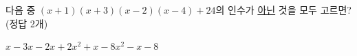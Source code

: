 다음 중 $(x+1)(x+3)(x-2)(x-4)+24$의 인수가 \underline{아닌} 것을 모두 고르면? (정답 2개)
\begin{choices32}{$x-3$}{$x-2$}{$x+2$}{$x^2+x-8$}{$x^2-x-8$}\end{choices32}
